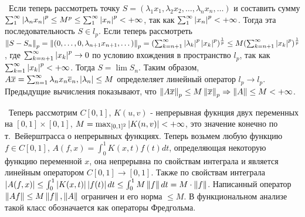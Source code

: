 \medskip
\noindent\textbullet~Если теперь рассмотреть точку $S = (\lambda_1 x_1, \lambda_2 x_2, \dots, \lambda_n x_n , \dots)$ и составить сумму $\sum_1^\infty 
\left\lvert\lambda_n x_n\right\rvert^p \le M^p \le \sum_1^\infty \left\lvert x_n\right\rvert^p < +\infty$, так как $\sum_1^\infty \left\lvert x_n\right\rvert^p < +\infty$. Тогда эта последовательность $S \in l_p$. Если 
теперь рассмотреть $\left\lVert S - S_n\right\rVert_p = \left\lVert(0, \dots, 0, \lambda_{n+1} x_{n + 1}, \dots)\right\rVert_p = (\sum_{k = n + 1}^\infty \left\lvert\lambda_k\right\rvert^p \left\lvert x_k\right\rvert^p)^\frac{1}{p} \le 
M (\sum_{k = n+ 1}^\infty \left\lvert x_k\right\rvert^p)^\frac{1}{p}$, где $\sum_{k = n + 1}^\infty \left\lvert x_k\right\rvert^p \to 0$ по условию вхождения в пространство $l_p$, так как 
$\sum_{k = 1}^\infty \left\lvert x_k\right\rvert^p < +\infty$. Тогда $S = \lim S_n$. Таким образом, $A\overline{x} = \sum_{n = 1}^\infty \lambda_n x_n \overline{e}_n, \left\lvert\lambda_n\right\rvert \le M$ 
определеляет линейный оператор $l_p \to l_p$. Предыдущие вычисления показывают, что $\left\lVert A \overline{x}\right\rVert_p \le M \left\lVert\overline{x}\right\rVert_p \Rightarrow \left\lVert A\right\rVert \le M < 
+\infty$.

\medskip
\noindent\textbullet~Теперь рассмотрим $C[0, 1]$, $K(u,v)$ - непрерывная фукнция двух переменных на $[0,1] \times [0, 1]$, $M = \max_{[0, 1]^2} \left\lvert K(n, v)\right\rvert < +\infty$, 
это значение конечно по т.~Вейерштрасса о непрерывных функциях. Теперь возьмем любую функцию $f \in C[0, 1]$, $A(f, x) = \int_0^1 K(x, t) f(t) dt$, определяющая некоторую 
функцию переменной $x$, она непрерывна по свойствам интеграла и является линейным оператором $C[0, 1] \to [0, 1]$. Также по свойствам интеграла $\left\lvert A(f, x)\right\rvert \le 
\int_0^1 \left\lvert K(x, t)\right\rvert \left\lvert f(t)\right\rvert dt \le \int_0^1 M \left\lVert f\right\rVert dt = M \cdot \left\lVert f\right\rVert$. Написанный оператор $\left\lVert A f\right\rVert \le M \left\lVert f\right\rVert, \left\lVert A\right\rVert$ ограничен и его 
норма  $\le M$. В функциональном анализе такой класс обозначается как операторы Фредгольма.
